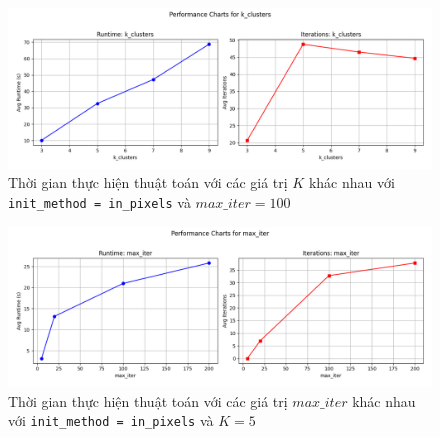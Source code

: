 \begin{figure}[H]
	\centering
	\includegraphics[width=\textwidth]{images/res/performance_k_clusters.png}
	\caption{Thời gian thực hiện thuật toán với các giá trị $K$ khác nhau với \texttt{init\_method = in\_pixels} và $max\_iter = 100$}
\end{figure}

\begin{figure}[H]
	\centering
	\includegraphics[width=\textwidth]{images/res/performance_max_iter.png}
	\caption{Thời gian thực hiện thuật toán với các giá trị $max\_iter$ khác nhau với \texttt{init\_method = in\_pixels} và $K = 5$}
\end{figure}
